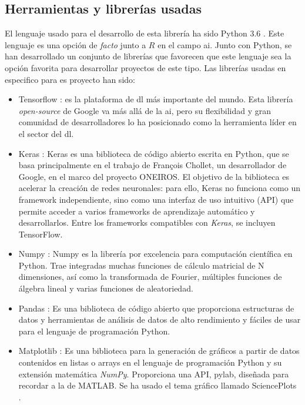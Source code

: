 \subsection{Herramientas y librerías usadas} \label{used_libs}

El lenguaje usado para el desarrollo de esta librería ha sido Python 3.6 \cite{python}. Este lenguaje es una opción de \textit{facto} junto a $R$ en el campo \acrlong{ai}. Junto con Python, se han desarrollado un conjunto de librerías que favorecen que este lenguaje sea la opción favorita para desarrollar proyectos de este tipo. Las librerías usadas en especifico para es proyecto han sido:
 
\begin{itemize}
    \item Tensorflow \cite{tensorflow2015-whitepaper}: es la plataforma de \acrlong{dl} más importante del mundo. Esta librería \textit{open-source} de Google va más allá de la \acrlong{ai}, pero su flexibilidad y gran comunidad de desarrolladores lo ha posicionado como la herramienta líder en el sector del \acrlong{dl}.
    \item Keras \cite{keras}: Keras es una biblioteca de código abierto escrita en Python, que se basa principalmente en el trabajo de François Chollet, un desarrollador de Google, en el marco del proyecto ONEIROS. El objetivo de la biblioteca es acelerar la creación de redes neuronales: para ello, Keras no funciona como un framework independiente, sino como una interfaz de uso intuitivo (API) que permite acceder a varios frameworks de aprendizaje automático y desarrollarlos. Entre los frameworks compatibles con \textit{Keras}, se incluyen TensorFlow.
    \item Numpy \cite{numpy}: Numpy es la librería por excelencia para computación científica en Python. Trae integradas muchas funciones de cálculo matricial de N dimensiones, así como la transformada de Fourier, múltiples funciones de álgebra lineal y varias funciones de aleatoriedad.
    \item Pandas \cite{pandas}: Es una biblioteca de código abierto que proporciona estructuras de datos y herramientas de análisis de datos de alto rendimiento y fáciles de usar para el lenguaje de programación Python.
    \item Matplotlib \cite{matplotlib}: Es una biblioteca para la generación de gráficos a partir de datos contenidos en listas o arrays en el lenguaje de programación Python y su extensión matemática \textit{NumPy}. Proporciona una API, pylab, diseñada para recordar a la de MATLAB. Se ha usado el tema gráfico llamado SciencePlots \cite{SciencePlots}.
\end{itemize}